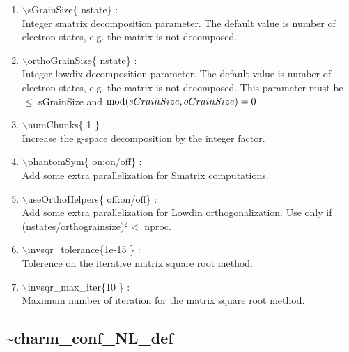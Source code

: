 \documentclass[12pt]{article}
\begin{document}
\begin{enumerate}
  \vspace{0.15in} 
  \item $\backslash$sGrainSize\{ nstate\} : \\    
  Integer smatrix decomposition parameter. The default value is number of
  electron states, e.g. the matrix is not decomposed.
  \vspace{0.15in} 
  \item $\backslash$orthoGrainSize\{ nstate\} : \\    
  Integer lowdix decomposition parameter. The default value is number of
  electron states, e.g. the matrix is not decomposed. This parameter
  must be $\leq$ sGrainSize and ${\rm mod}(sGrainSize,oGrainSize)=0$.
  \vspace{0.15in} 
  \item $\backslash$numChunks\{ 1 \} : \\    
  Increase the g-space decomposition by the integer factor.
  \vspace{0.15in} 
  \item $\backslash$phantomSym\{ on:on/off\} : \\    
  Add some extra parallelization for Smatrix computations.
  \vspace{0.15in} 
  \item $\backslash$useOrthoHelpers\{ off:on/off\} : \\    
  Add some extra parallelization for Lowdin orthogonalization.
  Use only if (nstates/orthograinsize)$^2<$ nproc.
  \vspace{0.15in} 
  \item $\backslash$invsqr\_tolerance\{1e-15 \} : \\   
  Tolerence on the iterative matrix square root method.
  \vspace{0.15in} 
  \item $\backslash$invsqr\_max\_iter\{10 \} : \\    
  Maximum number of iteration for the matrix square root method.
\end{enumerate}

\newpage
\subsection*{\bf \~{ }charm\_conf\_NL\_def}
\end{document}
